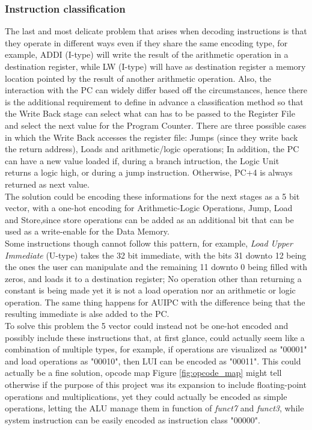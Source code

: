 \subsubsection{Instruction classification}
The last and most delicate problem that arises when decoding instructions is that they operate in different ways even if they share the same encoding type, for example, ADDI (I-type) will write the result of the arithmetic operation in a destination register, while LW (I-type) will have as destination register a memory location pointed by the result of another arithmetic operation. Also, the interaction with the PC can widely differ based off the circumstances, hence there is the additional requirement to define in advance a classification method so that the Write Back stage can select what can has to be passed to the Register File and select the next value for the Program Counter. There are three possible cases in which the Write Back accesses the register file: Jumps (since they write back the return address), Loads and arithmetic/logic operations; In addition, the PC can have a new value loaded if, during a branch intruction, the Logic Unit returns a logic high, or during a jump instruction. Otherwise, PC+4 is always returned as next value.\\
The solution could be encoding these informations for the next stages as a 5 bit vector, with a one-hot encoding for Arithmetic-Logic Operations, Jump, Load and Store,since store operations can be added as an additional bit that can be used as a write-enable for the Data Memory.\\
Some instructions though cannot follow this pattern, for example, \emph{Load Upper Immediate} (U-type) takes the 32 bit immediate, with the bits 31 downto 12 being the ones the user can manipulate and the remaining 11 downto 0 being filled with zeros, and loads it to a destination register; No operation other than returning a constant is being made yet it is not a load operation nor an arithmetic or logic operation. The same thing happens for AUIPC with the difference being that the resulting immediate is alse added to the PC.\\
To solve this problem the 5 vector could instead not be one-hot encoded and possibly include these instructions that, at first glance, could actually seem like a combination of multiple types, for example, if operations are visualized as "00001" and load operations as "00010", then LUI can be encoded as "00011". This could actually be a fine solution, opcode map Figure \ref{fig:opcode_map} might tell otherwise if the purpose of this project was its expansion to include floating-point operations and multiplications, yet they could actually be encoded as simple operations, letting the ALU manage them in function of \emph{funct7} and \emph{funct3}, while system instruction can be easily encoded as instruction class "00000".

